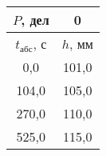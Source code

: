 \begin{tabular}[t]{|c|c|}
\hline
$P$, дел & 0 \\
\hline
$t_{абс}$, с & $h$, мм \\ 
\hline
0,0 & 101,0 \\ 
104,0 & 105,0 \\ 
270,0 & 110,0 \\ 
525,0 & 115,0 \\ 
\hline
\end{tabular}